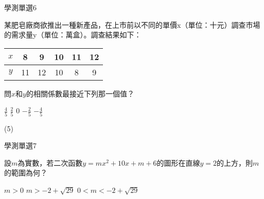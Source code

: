 \begin{QUESTIONS}
\begin{QUESTION}
\begin{ExamInfo}{84}{學測}{單選}{6}
        \end{ExamInfo}
        \begin{ExamAnsRateInfo}{}{}{}{}
        \end{ExamAnsRateInfo}
        \begin{QBODY}
            某肥皂廠商欲推出一種新產品，在上市前以不同的單價x（單位：十元）調查市場的需求量y（單位：萬盒）。調查結果如下：
            \begin{tabular}{|c|c|c|c|c|c|}
                \hline 
                $x$ &	8&	9&	10&	11&	12 \\ 
                \hline 
                $y$	&  11&	12&	10&	8&	9  \\ 
                \hline 
            \end{tabular} 
            
            
            問$x$和$y$的相關係數最接近下列那一個值？
            \begin{QOPS}
            \QOP $\frac{4}{5}$
            \QOP $\frac{2}{5}$
            \QOP $0$
            \QOP $-\frac{2}{5}$
            \QOP $-\frac{4}{5}$
        \end{QOPS}
        \end{QBODY}
        \begin{QFROMS}
        \end{QFROMS}
        \begin{QTAGS}\end{QTAGS}
        \begin{QANS}
            (5)
        \end{QANS}
        \begin{QSOLLIST}
        \end{QSOLLIST}
        \begin{QEMPTYSPACE}
        \end{QEMPTYSPACE}
    \end{QUESTION}
    \begin{QUESTION}
        \begin{ExamInfo}{84}{學測}{單選}{7}
        \end{ExamInfo}
        \begin{ExamAnsRateInfo}{}{}{}{}
        \end{ExamAnsRateInfo}
        \begin{QBODY}
            設$m$為實數，若二次函數$y=m{{x}^{2}}+10x+m+6$的圖形在直線$y=2$的上方，則$m$的範圍為何？
            \begin{QOPS}
                \QOP $m>0$
                \QOP $m>-2+\sqrt{29}$
                \QOP $0<m<-2+\sqrt{29}$

\end{QOPS}
\end{QBODY}
\end{QUESTION}
\end{QUESTIONS}
